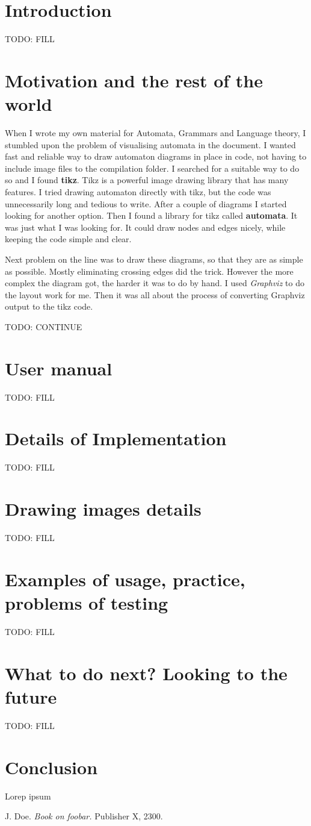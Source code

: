 \documentclass{ctuthesis}
\begin{document}
\maketitle

\chapter{Introduction}
TODO: FILL


\chapter{Motivation and the rest of the world}
When I wrote my own material for Automata, Grammars and Language theory, I stumbled upon the problem of visualising automata in the document. I wanted fast and reliable way to draw automaton diagrams in place in code, not having to include image files to the compilation folder. I searched for a suitable way to do so and I found \textbf{tikz}. Tikz is a powerful image drawing library that has many features. I tried drawing automaton directly with tikz, but the code was unnecessarily long and tedious to write. After a couple of diagrams I started looking for another option. Then I found a library for tikz called \textbf{automata}. It was just what I was looking for. It could draw nodes and edges nicely, while keeping the code simple and clear. 

Next problem on the line was to draw these diagrams, so that they are as simple as possible. Mostly eliminating crossing edges did the trick. However the more complex the diagram got, the harder it was to do by hand. I used \textit{Graphviz} to do the layout work for me. Then it was all about the process of converting Graphviz output to the tikz code.

TODO: CONTINUE

\chapter{User manual}
TODO: FILL

\chapter{Details of Implementation}
TODO: FILL

\chapter{Drawing images details}
TODO: FILL

\chapter{Examples of usage, practice, problems of testing}

TODO: FILL

\chapter{What to do next? Looking to the future}
TODO: FILL


\chapter{Conclusion}
Lorep ipsum \cite{doe}

\begin{thebibliography}{1}
 J. Doe. \emph{Book on foobar.} Publisher X,
2300.
\end{thebibliography}
\end{document}
